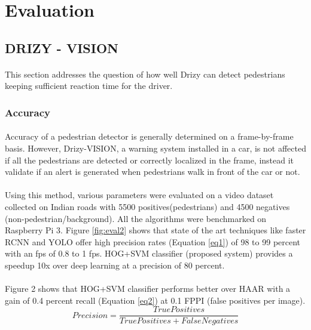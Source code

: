 \section{Evaluation}

\subsection{DRIZY - VISION}
\paragraph{}This section addresses the question of how well Drizy can detect pedestrians keeping sufficient reaction time for the driver.
\subsubsection{Accuracy}
\paragraph{}Accuracy of a pedestrian detector is generally determined on a frame-by-frame basis. However, Drizy-VISION, a warning system installed in a car, is not affected if all the pedestrians are detected or correctly localized in the frame, instead it validate if an alert is generated when pedestrians walk in front of the car or not.
\paragraph{}Using this method, various parameters were evaluated on a video dataset collected on Indian roads with 5500 positives(pedestrians) and 4500 negatives (non-pedestrian/background). All the algorithms were benchmarked on Raspberry Pi 3. Figure \ref{fig:eval2} shows that state of the art techniques like faster RCNN and YOLO offer high precision rates (Equation \ref{eq1}) of 98 to 99 percent with an fps of 0.8 to 1 fps. HOG+SVM classifier (proposed system) provides a speedup 10x over deep learning at a precision of 80 percent.
\paragraph{}Figure 2 shows that HOG+SVM classifier performs better over HAAR with a gain of 0.4 percent recall (Equation \ref{eq2}) at 0.1 FPPI (false positives per image).
\begin{equation}
    Precision = \frac{True Positives}{True Positives + False Negatives}
    \label{eq1}
\end{equation}\\

